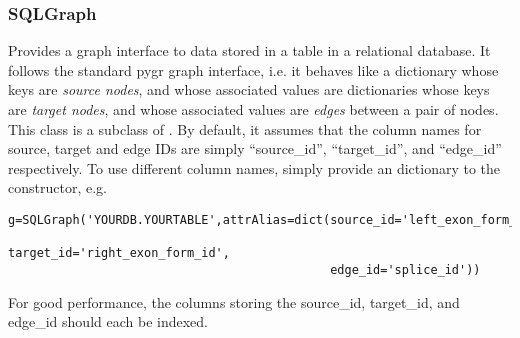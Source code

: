 \documentclass{howto}
\begin{document}
\subsubsection{SQLGraph}
Provides a graph interface to data stored in a table
in a relational database.  It follows the standard pygr 
graph interface, i.e. it behaves like a dictionary whose
keys are {\em source nodes}, and whose associated
values are dictionaries whose keys are {\em target nodes},
and whose associated values are {\em edges} between
a pair of nodes.  This class is a subclass of 
.  By default, it assumes that
the column names for source, target and edge IDs are simply
``source_id'', ``target_id'', and ``edge_id'' respectively.
To use different column names, simply provide an 
dictionary to the constructor, e.g.
\begin{verbatim}
g=SQLGraph('YOURDB.YOURTABLE',attrAlias=dict(source_id='left_exon_form_id',
                                             target_id='right_exon_form_id',
                                             edge_id='splice_id'))
\end{verbatim}
For good performance, the columns storing the source_id, target_id,
and edge_id should each be indexed.
\end{document}
